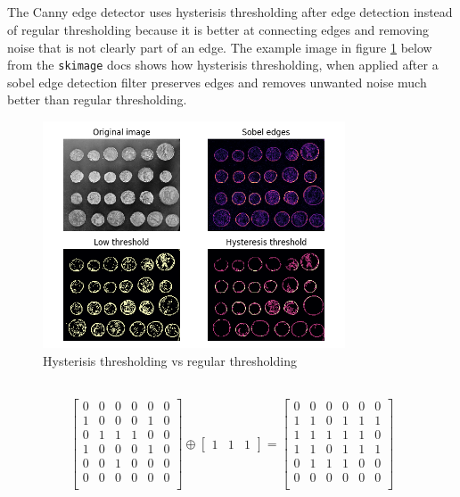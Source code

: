 \documentclass[]{article}
\begin{document}
\subsection{}
The Canny edge detector uses hysterisis thresholding after edge detection instead of regular thresholding because it is better at connecting edges and removing noise that is not clearly part of an edge. The example image in figure \ref{fig:hysterisis_skimage} below from the \texttt{skimage} docs shows how hysterisis thresholding, when applied after a sobel edge detection filter preserves edges and removes unwanted noise much better than regular thresholding.

\begin{figure}[H]
\centering
\includegraphics[width=0.8\textwidth]{img/hysterisis_skimage}
\caption{Hysterisis thresholding vs regular thresholding}
\label{fig:hysterisis_skimage}
\end{figure}

\subsection{}
\begin{equation}\begin{aligned}
\begin{bmatrix}
0 & 0 & 0 & 0 & 0 & 0 \\
1 & 0 & 0 & 0 & 1 & 0 \\
0 & 1 & 1 & 1 & 0 & 0 \\
1 & 0 & 0 & 0 & 1 & 0 \\
0 & 0 & 1 & 0 & 0 & 0 \\
0 & 0 & 0 & 0 & 0 & 0 \\
\end{bmatrix}
\oplus
\begin{bmatrix} 1 & 1 & 1 \end{bmatrix} =
\begin{bmatrix}
0 & 0 & 0 & 0 & 0 & 0 \\
1 & 1 & 0 & 1 & 1 & 1 \\
1 & 1 & 1 & 1 & 1 & 0 \\
1 & 1 & 0 & 1 & 1 & 1 \\
0 & 1 & 1 & 1 & 0 & 0 \\
0 & 0 & 0 & 0 & 0 & 0 \\
\end{bmatrix}
\end{aligned}\end{equation}
\end{document}
